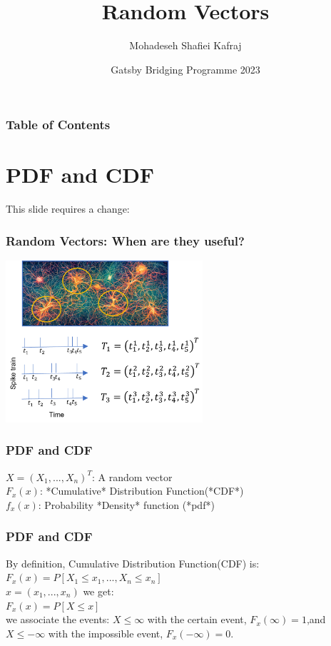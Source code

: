 \documentclass{beamer}
\title[Random Vectors ]
{Random Vectors\newline }
\subtitle{}
\author[Mohadeseh Shafiei Kafraj] %
{Mohadeseh Shafiei Kafraj\inst{1}}
\institute[UCL] %
{
  \inst{1}%
  Gatsby Computational Neuroscience Unit\\
  University College London
}
\date[Gatsby Bridging Programme  2023] %
{Gatsby Bridging Programme 2023}
\begin{document}
\frame{\titlepage}

\begin{frame}
\frametitle{Table of Contents}
\tableofcontents
\end{frame}


\section{PDF and CDF}
\begin{frame}
This slide requires a change:
\frametitle{Random Vectors: When are they useful?}
\center \includegraphics[height=6cm]{Random_Vector_Example.png}
\end{frame}

\begin{frame}
\frametitle{PDF and CDF}
$X = (X_1, ..., X_n)^T$: A random vector\newline \\
$F_x(x)$: *Cumulative* Distribution Function(*CDF*)\newline\\
$f_x(x)$: Probability *Density* function (*pdf*)\newline\\
\end{frame}

\begin{frame}
\frametitle{PDF and CDF}
By definition, Cumulative Distribution Function(CDF) is:\newline
$F_x(x) = P[X_1 \le x_1, ..., X_n\le x_n]$\newline\\
$x = (x_1, ..., x_n)$ we get:\newline\\
$F_x(x) = P[X\le x]$\newline\\
we associate the events:\newline
${X \le \infty}$ with the certain event, $F_x(\infty) = 1$,and\newline\\
${X \le -\infty}$ with the impossible event, $F_x(-\infty) = 0.$\\
\end{frame}
\end{document}
